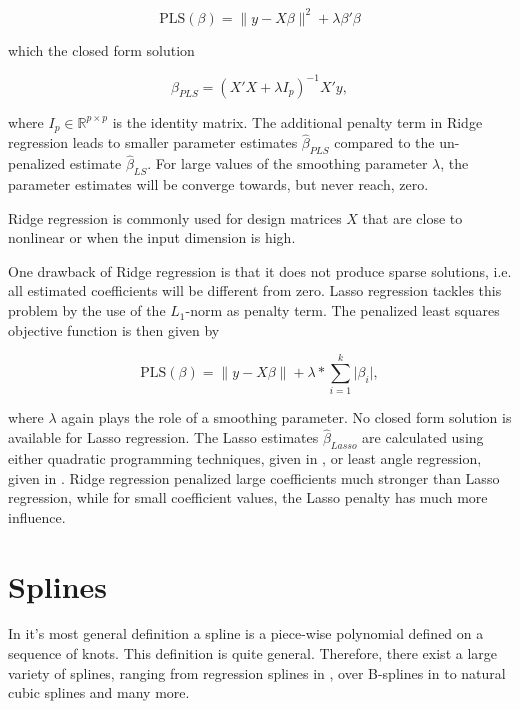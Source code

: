 $$\text{PLS}(\beta) = \lVert y - X\beta\rVert^2 + \lambda \beta'\beta$$

which the closed form solution 

$$\hat\beta_{PLS} = (X'X + \lambda I_p)^{-1}X'y,$$

where $I_p \in \mathbb R^{p \times p}$ is the identity matrix. The additional penalty term in Ridge regression leads to smaller parameter estimates $\hat \beta_{PLS}$ compared to the un-penalized estimate $\hat \beta_{LS}$. For large values of the smoothing parameter $\lambda$, the parameter estimates will be converge towards, but never reach, zero. 

Ridge regression is commonly used for design matrices $X$ that are close to nonlinear or when the input dimension is high. \cite{hoerl1970ridge}


One drawback of Ridge regression is that it does not produce sparse solutions, i.e. all estimated coefficients will be different from zero. Lasso regression tackles this problem by the use of the $L_1$-norm as penalty term. The penalized least squares objective function is then given by

$$\text{PLS}(\beta) = \lVert y - X\beta \rVert + \lambda*\sum_{i=1}^k\vert \beta_i\vert,$$

where $\lambda$ again plays the role of a smoothing parameter. No closed form solution is available for Lasso regression. The Lasso estimates  $\hat \beta_{Lasso}$ are calculated using either quadratic programming techniques, given in \cite{tibshirani1996lasso}, or least angle regression, given in \cite{efron2004leastangleregression}. Ridge regression penalized large coefficients much stronger than Lasso regression, while for small coefficient values, the Lasso penalty has much more influence. \cite{tibshirani1996lasso}


\section{Splines} \label{SectionSplines}
	
In it's most general definition a spline is a piece-wise polynomial defined on a sequence of knots. This definition is quite general. Therefore, there exist a large variety of splines, ranging from regression splines in \cite{eubank1990regressionsplines}, over B-splines in \cite{deBoor1978practicalGuideToSplines} to natural cubic splines and many more.

